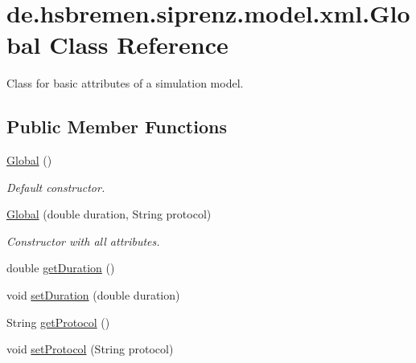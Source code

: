 \hypertarget{classde_1_1hsbremen_1_1siprenz_1_1model_1_1xml_1_1Global}{}\section{de.\+hsbremen.\+siprenz.\+model.\+xml.\+Global Class Reference}
\label{classde_1_1hsbremen_1_1siprenz_1_1model_1_1xml_1_1Global}


Class for basic attributes of a simulation model.  


\subsection*{Public Member Functions}
\begin{DoxyCompactItemize}
\item 
\hyperlink{classde_1_1hsbremen_1_1siprenz_1_1model_1_1xml_1_1Global_a198109a1583701cd7d539e1cb83ff5dd}{Global} ()\hypertarget{classde_1_1hsbremen_1_1siprenz_1_1model_1_1xml_1_1Global_a198109a1583701cd7d539e1cb83ff5dd}{}\label{classde_1_1hsbremen_1_1siprenz_1_1model_1_1xml_1_1Global_a198109a1583701cd7d539e1cb83ff5dd}

\begin{DoxyCompactList}\small\item\em Default constructor. \end{DoxyCompactList}\item 
\hyperlink{classde_1_1hsbremen_1_1siprenz_1_1model_1_1xml_1_1Global_a8ed1578404376e0621acefda9475348e}{Global} (double duration, String protocol)
\begin{DoxyCompactList}\small\item\em Constructor with all attributes. \end{DoxyCompactList}\item 
double \hyperlink{classde_1_1hsbremen_1_1siprenz_1_1model_1_1xml_1_1Global_a3c79d4ed803ae0ce72c396387bb63600}{get\+Duration} ()
\item 
void \hyperlink{classde_1_1hsbremen_1_1siprenz_1_1model_1_1xml_1_1Global_a88bc3641562ad88dad84cfbd3f12bdbe}{set\+Duration} (double duration)
\item 
String \hyperlink{classde_1_1hsbremen_1_1siprenz_1_1model_1_1xml_1_1Global_abb53f93267ae302a6aee8d1dfd854f3d}{get\+Protocol} ()
\item 
void \hyperlink{classde_1_1hsbremen_1_1siprenz_1_1model_1_1xml_1_1Global_a0b4717ccdcc05c0936946e767610e1ff}{set\+Protocol} (String protocol)
\end{DoxyCompactItemize}


